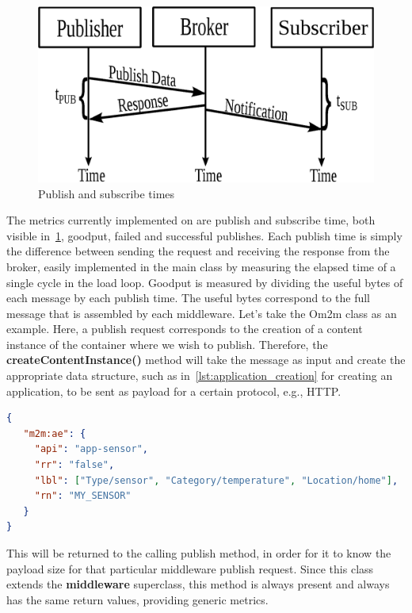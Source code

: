 \documentclass[conference]{IEEEtran}
\begin{document}
\begin{figure}[htbp!]
  \centering
  \includegraphics[width=\linewidth]{figures/pub_sub_time.eps}
  \caption{Publish and subscribe times~\cite{cardoso_benchmarking_2017}}
  \label{fig:pub_sub_time}
\end{figure}

The metrics currently implemented on are publish and subscribe time, both visible in~\ref{fig:pub_sub_time}, goodput, failed and successful publishes. Each publish time is simply the difference between sending the request and receiving the response from the broker, easily implemented in the main class by measuring the elapsed time of a single cycle in the load loop. Goodput is measured by dividing the useful bytes of each message by each publish time. The useful bytes correspond to the full message that is assembled by each middleware. Let's take the Om2m class as an example. Here, a publish request corresponds to the creation of a content instance of the container where we wish to publish. Therefore, the \textbf{createContentInstance()} method will take the message as input and create the appropriate data structure, such as in~\ref{lst:application_creation} for creating an application, to be sent as payload for a certain protocol, e.g., HTTP\@.

\begin{lstlisting}[linewidth=\columnwidth, caption=JSON payload for application creation, captionpos=b, label=lst:application_creation, language=json]
{
   "m2m:ae": {
     "api": "app-sensor",
     "rr": "false",
     "lbl": ["Type/sensor", "Category/temperature", "Location/home"],
     "rn": "MY_SENSOR"
   }
}
\end{lstlisting}

This will be returned to the calling publish method, in order for it to know the payload size for that particular middleware publish request. Since this class extends the \textbf{middleware} superclass, this method is always present and always has the same return values, providing generic metrics. 
\end{document}

